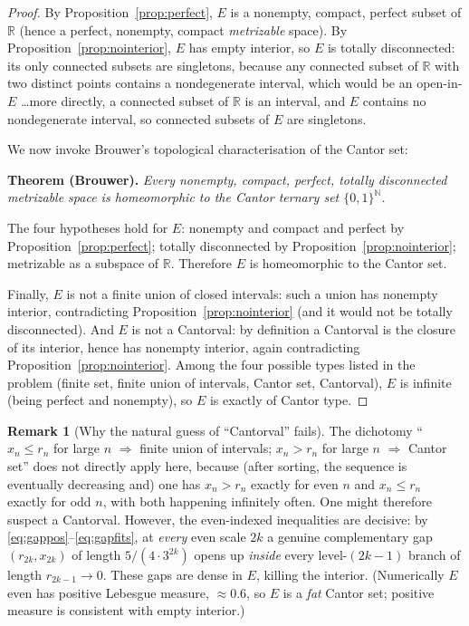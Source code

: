 \documentclass{amsart}
\theoremstyle{definition}
\newtheorem*{remark}{Remark}
\begin{document}
\begin{proof}
By Proposition~\ref{prop:perfect}, $E$ is a nonempty, compact, perfect subset of $\mathbb R$
(hence a perfect, nonempty, compact \emph{metrizable} space). By
Proposition~\ref{prop:nointerior}, $E$ has empty interior, so $E$ is totally disconnected:
its only connected subsets are singletons, because any connected subset of $\mathbb R$ with two
distinct points contains a nondegenerate interval, which would be an open-in-$E$ \dots more
directly, a connected subset of $\mathbb R$ is an interval, and $E$ contains no nondegenerate
interval, so connected subsets of $E$ are singletons.

We now invoke Brouwer's topological characterisation of the Cantor set:

\medskip
\noindent\textbf{Theorem (Brouwer).} \emph{Every nonempty, compact, perfect, totally
disconnected metrizable space is homeomorphic to the Cantor ternary set
$\{0,1\}^{\mathbb N}$.}
\medskip

\noindent The four hypotheses hold for $E$: nonempty and compact and perfect by
Proposition~\ref{prop:perfect}; totally disconnected by Proposition~\ref{prop:nointerior};
metrizable as a subspace of $\mathbb R$. Therefore $E$ is homeomorphic to the Cantor set.

Finally, $E$ is not a finite union of closed intervals: such a union has nonempty interior,
contradicting Proposition~\ref{prop:nointerior} (and it would not be totally disconnected). And
$E$ is not a Cantorval: by definition a Cantorval is the closure of its interior, hence has
nonempty interior, again contradicting Proposition~\ref{prop:nointerior}. Among the four
possible types listed in the problem (finite set, finite union of intervals, Cantor set,
Cantorval), $E$ is infinite (being perfect and nonempty), so $E$ is exactly of Cantor type.
\end{proof}

\begin{remark}[Why the natural guess of ``Cantorval'' fails]
The dichotomy ``$x_n\le r_n$ for large $n$ $\Rightarrow$ finite union of intervals; $x_n>r_n$
for large $n$ $\Rightarrow$ Cantor set'' does not directly apply here, because (after sorting,
the sequence is eventually decreasing and) one has $x_n>r_n$ exactly for even $n$ and
$x_n\le r_n$ exactly for odd $n$, with both happening infinitely often. One might therefore
suspect a Cantorval. However, the even-indexed inequalities are decisive: by
\eqref{eq:gappos}--\eqref{eq:gapfits}, at \emph{every} even scale $2k$ a genuine complementary
gap $(r_{2k},x_{2k})$ of length $5/(4\cdot3^{2k})$ opens up \emph{inside} every
level-$(2k-1)$ branch of length $r_{2k-1}\to0$. These gaps are dense in $E$, killing the
interior. (Numerically $E$ even has positive Lebesgue measure, $\approx 0.6$, so $E$ is a
\emph{fat} Cantor set; positive measure is consistent with empty interior.)
\end{remark}
\end{document}
